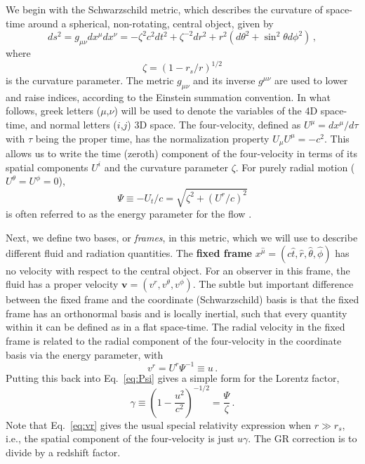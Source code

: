 \documentclass[../main.tex]{subfiles}
\begin{document}
We begin with the Schwarzschild metric, which describes the curvature of space-time around a spherical, non-rotating, central object, given by
\begin{equation}
ds^2=g_{\mu\nu}dx^\mu dx^\nu=-\zeta^2 c^2dt^2+\zeta^{-2}dr^2 +r^2(d\theta^2+\sin^2\theta d\phi^2)\,,
\end{equation}
where
\begin{equation}\label{eq:zeta}
    \zeta=(1-r_s/r)^{1/2}
\end{equation}
is the curvature parameter. The metric $g_{\mu\nu}$ and its inverse $g^{\mu\nu}$ are used to lower and raise indices, according to the Einstein summation convention.  In what follows, greek letters ($\mu$,$\nu$) will be used to denote the variables of the 4D space-time, and normal letters ($i$,$j$) 3D space.  The four-velocity, defined as $U^\mu=dx^\mu/d\tau$ with $\tau$ being the proper time, has the normalization property $U_\mu U^\mu=-c^2$.  This allows us to write the time (zeroth) component of the four-velocity in terms of its spatial components $U^i$ and the curvature parameter $\zeta$.  For purely radial motion ($U^\theta=U^\phi=0$),
\begin{equation}\label{eq:Psi}
    \Psi\equiv -U_t/c=\sqrt{\zeta^2+(U^r/c)^2}
\end{equation}
is often referred to as the energy parameter for the flow \citep{Thorne1981}. 

Next, we define two bases, or \textit{frames}, in this metric, which we will use to describe different fluid and radiation quantities.  The \textbf{fixed frame} $x^{\hat{\mu}}=(c\hat{t},\hat{r},\hat{\theta},\hat{\phi})$ has no velocity with respect to the central object.  For an observer in this frame, the fluid has a proper velocity $\bm{v}=(v^r,v^\theta,v^\phi)$.  The subtle but important difference between the fixed frame and the coordinate (Schwarzschild) basis is that the fixed frame has an orthonormal basis and is locally inertial, such that every quantity within it can be defined as in a flat space-time. The radial velocity in the fixed frame is related to the radial component of the four-velocity in the coordinate basis via the energy parameter, with
\begin{equation}\label{eq:vr}
    v^r=U^r\Psi^{-1}\equiv u\, .
\end{equation}
Putting this back into Eq.~\eqref{eq:Psi} gives a simple form for the Lorentz factor,
\begin{equation}\label{eq:gamma}
\gamma\equiv\left(1-\frac{u^2}{c^2}\right)^{-1/2}=\frac{\Psi}{\zeta} \,.
\end{equation}
Note that Eq.~\eqref{eq:vr} gives the usual special relativity expression when $r\gg r_s$, i.e., the spatial component of the four-velocity is just $u\gamma$. The GR correction is to divide by a redshift factor.
\end{document}
